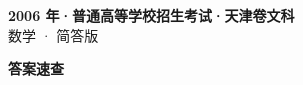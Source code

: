 \documentclass[zihao=-4, a4paper]{ctexart}
\begin{document}
\begin{center}
  {\Large\bfseries 2006 年·普通高等学校招生考试·天津卷文科}\\[4pt]
  {\large 数学 · 简答版}
\end{center}
\medskip
{}

\clearpage
{}
\begin{center}{\Large\bfseries 答案速查}\end{center}
\medskip

\end{document}
